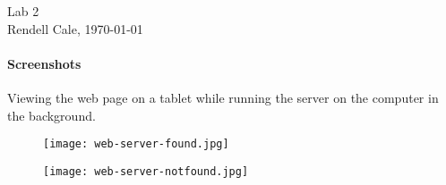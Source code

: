 \documentclass{article}
\begin{document}
Lab 2 \\
Rendell Cale, \today 

\paragraph{Screenshots}
Viewing the web page on a tablet while running the server on the computer in the background. 
\begin{figure}[h]
    \centering
    \begin{minipage}{.5\textwidth}
        \centering
        \texttt{[image: web-server-found.jpg]}
    \end{minipage}%
    \begin{minipage}{.5\textwidth}
        \centering
        \texttt{[image: web-server-notfound.jpg]}
    \end{minipage}
\end{figure}
\end{document}

